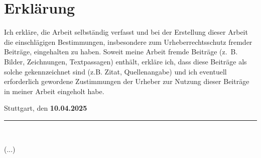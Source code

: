 \chapter*{Erklärung}
Ich erkläre, die Arbeit selbständig verfasst und bei der Erstellung dieser Arbeit die einschlägigen Bestimmungen, insbesondere zum Urheberrechtsschutz fremder Beiträge, eingehalten zu haben. Soweit meine Arbeit fremde Beiträge (z. B. Bilder, Zeichnungen, Textpassagen) enthält, erkläre ich, dass diese Beiträge als solche gekennzeichnet sind (z.B. Zitat, Quellenangabe) und ich eventuell erforderlich gewordene Zustimmungen der Urheber zur Nutzung dieser Beiträge in meiner Arbeit eingeholt habe.

\vspace*{2cm}
\begin{flushleft}
Stuttgart, den \textbf{10.04.2025}
\end{flushleft}
\begin{flushright}
\rule{45mm}{0.4pt}\\
\end{flushright}
\begin{flushright}
(...)
\end{flushright}